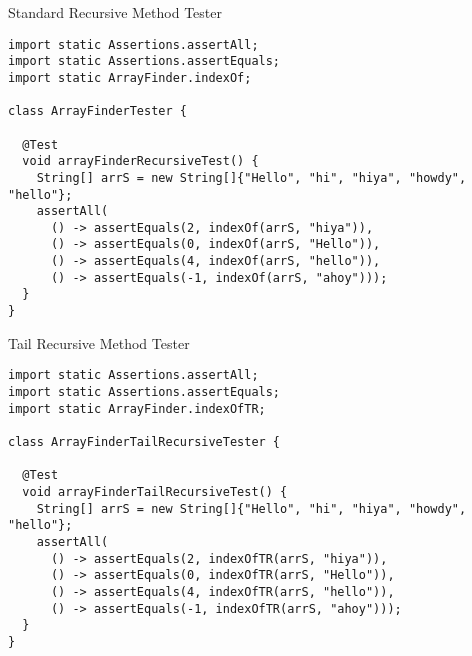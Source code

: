 
\begin{cl}{Standard Recursive  Method Tester}
\begin{lstlisting}[language=MyJava]
import static Assertions.assertAll;
import static Assertions.assertEquals;
import static ArrayFinder.indexOf;

class ArrayFinderTester {

  @Test
  void arrayFinderRecursiveTest() {
    String[] arrS = new String[]{"Hello", "hi", "hiya", "howdy", "hello"};
    assertAll(
      () -> assertEquals(2, indexOf(arrS, "hiya")),
      () -> assertEquals(0, indexOf(arrS, "Hello")),
      () -> assertEquals(4, indexOf(arrS, "hello")),
      () -> assertEquals(-1, indexOf(arrS, "ahoy")));
  }
}
\end{lstlisting}
\end{cl}

\begin{cl}{Tail Recursive  Method Tester}
\begin{lstlisting}[language=MyJava]
import static Assertions.assertAll;
import static Assertions.assertEquals;
import static ArrayFinder.indexOfTR;

class ArrayFinderTailRecursiveTester {

  @Test
  void arrayFinderTailRecursiveTest() {
    String[] arrS = new String[]{"Hello", "hi", "hiya", "howdy", "hello"};
    assertAll(
      () -> assertEquals(2, indexOfTR(arrS, "hiya")),
      () -> assertEquals(0, indexOfTR(arrS, "Hello")),
      () -> assertEquals(4, indexOfTR(arrS, "hello")),
      () -> assertEquals(-1, indexOfTR(arrS, "ahoy")));
  }
}
\end{lstlisting}
\end{cl}

